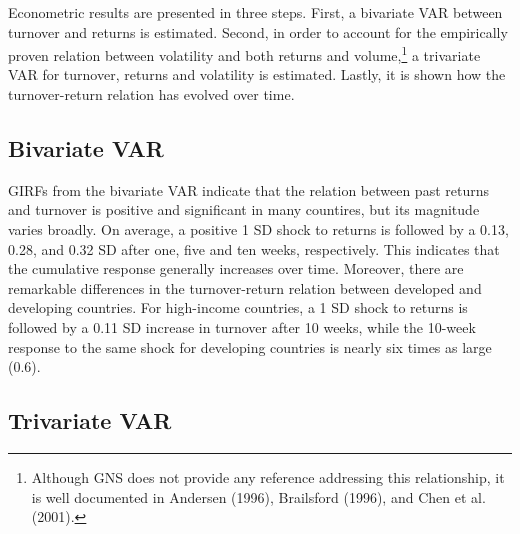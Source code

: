 \documentclass[final,3p,times,twocolumn]{elsarticle}
\begin{document}
Econometric results are presented in three steps. First, a bivariate VAR between turnover and returns is estimated. Second, in order to account for the empirically proven relation between volatility and both returns and volume,\footnote{Although GNS does not provide any reference addressing this relationship, it is well documented in Andersen (1996),  Brailsford (1996), and Chen et al. (2001).} a trivariate VAR for turnover, returns and volatility is estimated. Lastly, it is shown how the turnover-return relation has evolved over time.\par


\subsection{Bivariate VAR}


GIRFs from the bivariate VAR indicate that the relation between past returns and turnover is positive and significant in many countires, but its magnitude varies broadly. On average, a positive 1 SD shock to returns is followed by a 0.13, 0.28, and 0.32 SD after one, five and ten weeks, respectively. This indicates that the cumulative response generally increases over time. Moreover, there are remarkable differences in the turnover-return relation between developed and developing countries. For high-income countries, a 1 SD shock to returns is followed by a 0.11 SD increase in turnover after 10 weeks, while the 10-week response to the same shock for developing countries is nearly six times as large (0.6).\par


\subsection{Trivariate VAR}
\end{document}
